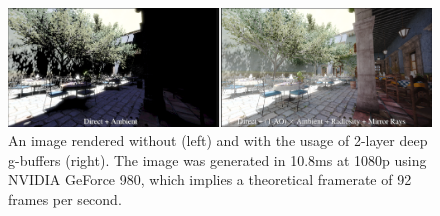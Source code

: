 \documentclass{ACGSeminar}
\begin{document}
	\begin{figure}[htb!]%
		\begin{center}%
			\includegraphics[width=16cm]{img/deep_g_buffer_render.png}
		\end{center}%
		\caption{An image rendered without (left) and with the usage of 2-layer deep g-buffers (right). The image was generated in 10.8ms at 1080p using NVIDIA GeForce 980, which implies a theoretical framerate of 92 frames per second.}%
		\label{fig:deep_g_buffer_render}%
	\end{figure}%

\printbibliography
\end{document}
